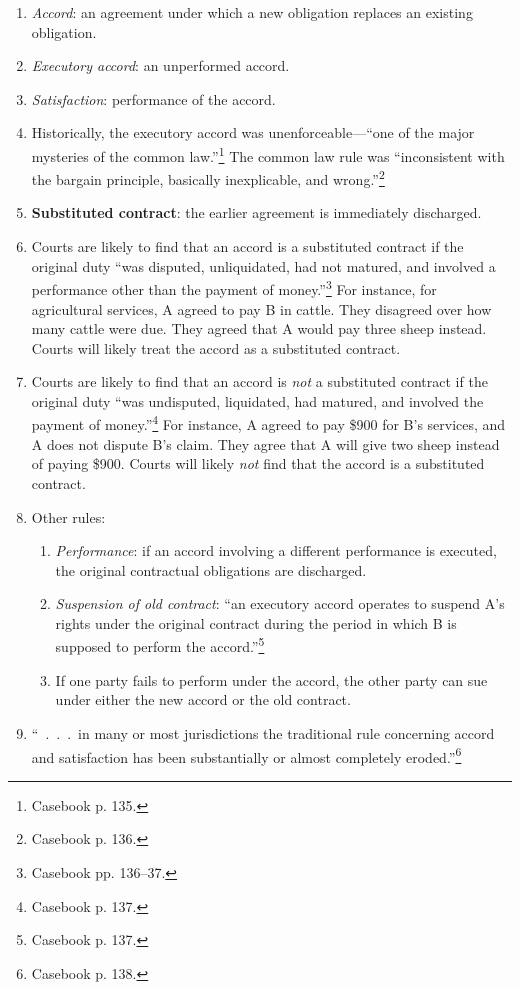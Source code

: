 \begin{enumerate}
    \item \emph{Accord}: an agreement under which a new obligation replaces an 
    existing obligation.
    \item \emph{Executory accord}: an unperformed accord.
    \item \emph{Satisfaction}: performance of the accord.
    \item Historically, the executory accord was unenforceable---``one of the 
    major mysteries of the common law.''\footnote{Casebook p. 135.} The common 
    law rule was ``inconsistent with the bargain principle, basically 
    inexplicable, and wrong.''\footnote{Casebook p. 136.}
    \item \textbf{Substituted contract}: the earlier agreement is immediately 
    discharged.
    \item Courts are likely to find that an accord is a substituted contract 
    if the original duty ``was disputed, unliquidated, had not matured, and 
    involved a performance other than the payment of 
    money.''\footnote{Casebook pp. 136--37.} For instance, for agricultural 
    services, A agreed to pay B in cattle. They disagreed over how many cattle 
    were due. They agreed that A would pay three sheep instead. Courts will 
    likely treat the accord as a substituted contract.
    \item Courts are likely to find that an accord is \emph{not} a substituted 
    contract if the original duty ``was undisputed, liquidated, had matured, 
    and involved the payment of money.''\footnote{Casebook p. 137.} For 
    instance, A agreed to pay \$900 for B's services, and A does not dispute 
    B's claim. They agree that A will give two sheep instead of paying \$900. 
    Courts will likely \emph{not} find that the accord is a substituted 
    contract.
    \item Other rules:
    \begin{enumerate}
        \item \emph{Performance}: if an accord involving a different 
        performance is executed, the original contractual obligations are 
        discharged.
        \item \emph{Suspension of old contract}: ``an executory accord 
        operates to suspend A's rights under the original contract during the 
        period in which B is supposed to perform the 
        accord.''\footnote{Casebook p. 137.}
        \item If one party fails to perform under the accord, the other party 
        can sue under either the new accord or the old contract.
    \end{enumerate}
    \item ``~.~.~.~in many or most jurisdictions the traditional rule 
    concerning accord and satisfaction has been substantially or almost 
    completely eroded.''\footnote{Casebook p. 138.}
\end{enumerate}

